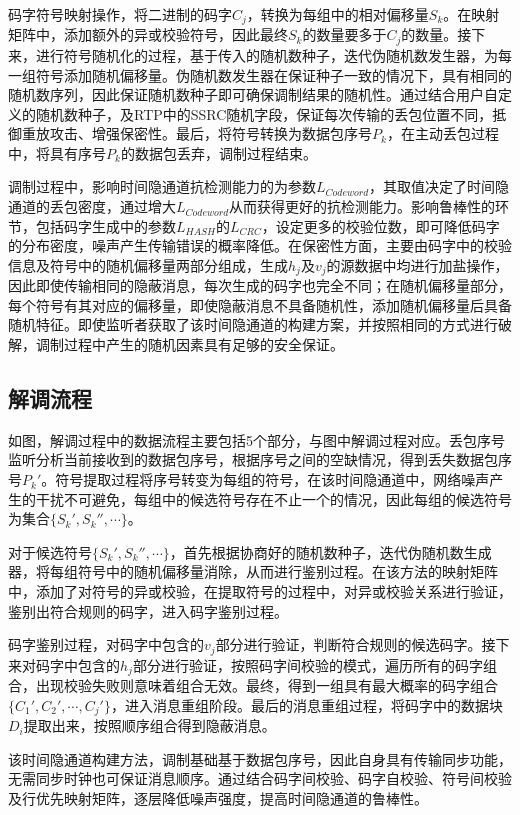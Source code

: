 码字符号映射操作，将二进制的码字$C_{j}$，转换为每组中的相对偏移量$S_{k}$。在映射矩阵中，添加额外的异或校验符号，因此最终$S_{k}$的数量要多于$C_{j}$的数量。接下来，进行符号随机化的过程，基于传入的随机数种子，迭代伪随机数发生器，为每一组符号添加随机偏移量。伪随机数发生器在保证种子一致的情况下，具有相同的随机数序列，因此保证随机数种子即可确保调制结果的随机性。通过结合用户自定义的随机数种子，及RTP中的SSRC随机字段，保证每次传输的丢包位置不同，抵御重放攻击、增强保密性。最后，将符号转换为数据包序号$P_{k}$，在主动丢包过程中，将具有序号$P_{k}$的数据包丢弃，调制过程结束。

调制过程中，影响时间隐通道抗检测能力的为参数$L_{Codeword}$，其取值决定了时间隐通道的丢包密度，通过增大$L_{Codeword}$从而获得更好的抗检测能力。影响鲁棒性的环节，包括码字生成中的参数$L_{HASH}$的$L_{CRC}$，设定更多的校验位数，即可降低码字的分布密度，噪声产生传输错误的概率降低。在保密性方面，主要由码字中的校验信息及符号中的随机偏移量两部分组成，生成$h_{j}$及$v_{j}$的源数据中均进行加盐操作，因此即使传输相同的隐蔽消息，每次生成的码字也完全不同；在随机偏移量部分，每个符号有其对应的偏移量，即使隐蔽消息不具备随机性，添加随机偏移量后具备随机特征。即使监听者获取了该时间隐通道的构建方案，并按照相同的方式进行破解，调制过程中产生的随机因素具有足够的安全保证。

\subsection{解调流程}
\label{chap:hash:results:demodulation}

如图，解调过程中的数据流程主要包括5个部分，与图中解调过程对应。丢包序号监听分析当前接收到的数据包序号，根据序号之间的空缺情况，得到丢失数据包序号$P_{k}'$。符号提取过程将序号转变为每组的符号，在该时间隐通道中，网络噪声产生的干扰不可避免，每组中的候选符号存在不止一个的情况，因此每组的候选符号为集合$\{S_{k}',S_{k}'',\cdots \}$。

对于候选符号$\{S_{k}',S_{k}'',\cdots \}$，首先根据协商好的随机数种子，迭代伪随机数生成器，将每组符号中的随机偏移量消除，从而进行鉴别过程。在该方法的映射矩阵中，添加了对符号的异或校验，在提取符号的过程中，对异或校验关系进行验证，鉴别出符合规则的码字，进入码字鉴别过程。

码字鉴别过程，对码字中包含的$v_{j}$部分进行验证，判断符合规则的候选码字。接下来对码字中包含的$h_{j}$部分进行验证，按照码字间校验的模式，遍历所有的码字组合，出现校验失败则意味着组合无效。最终，得到一组具有最大概率的码字组合$\{C_{1}',C_{2}',\cdots, C_{j}'\}$，进入消息重组阶段。最后的消息重组过程，将码字中的数据块$D_{i}$提取出来，按照顺序组合得到隐蔽消息。

该时间隐通道构建方法，调制基础基于数据包序号，因此自身具有传输同步功能，无需同步时钟也可保证消息顺序。通过结合码字间校验、码字自校验、符号间校验及行优先映射矩阵，逐层降低噪声强度，提高时间隐通道的鲁棒性。